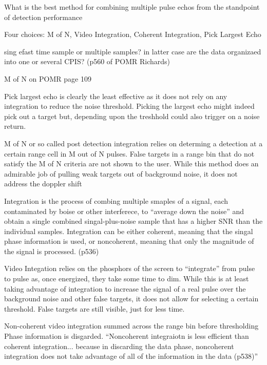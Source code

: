 \documentclass[12pt]{article}
\newenvironment{exercise}[2][Exercise]{\begin{trivlist}
    \item[\hskip \labelsep {\bfseries #1}\hskip \labelsep {\bfseries #2.}]}{\end{trivlist}}
\begin{document}
      \begin{exercise}{9}
      What is the best method for combining multiple pulse echos from the standpoint of detection performance

      Four choices: M of N, Video Integration, Coherent Integration, Pick Largest Echo

      sing efast time sample or multiple samples? in latter case are the data organizaed into one or several CPIS? (p560 of POMR Richards)

      M of N on POMR page 109



      Pick largest echo is clearly the least effective as it does not rely on any integration to reduce the noise threshold.  Picking the largest echo might indeed pick out a target but, depending upon the treshhold could also trigger on a noise return.

      M of N or so called post detection integration relies on determing a detection at a certain range cell in M out of N pulses. False targets in a range bin that do not satisfy the M of N criteria are not shown to the user.  While this method does an admirable job of pulling weak targets out of background noise, it does not address the doppler shift


      Integration is the process of combing multiple smaples of a signal, each contaminated by boise or other interferece, to ``average down the noise'' and obtain a single combined singal-plus-noise sample that has a higher SNR than the individual samples.  Integration can be either coherent, meaning that the singal phase information is used, or noncoherent, meaning that only the magnitude of the signal is processed. (p536)




      Video Integation relies on the phosphors of the screen to ``integrate'' from pulse to pulse as, once energized, they take some time to dim.  While this is at least taking advantage of integration to increase the signal of a real pulse over the background noise and other false targets, it does not allow for selecting a certain threshold.  False targets are still visible, just for less time.
      
      Non-coherent video integration 
      summed across the range bin before thresholding
      Phase information is disgarded.
      ``Noncoherent integraiotn is less efficient than coherent integration... because in discarding the data phase, noncoherent integration does not take advantage of all of the information in the data (p538)''





\end{exercise}
\end{document}
